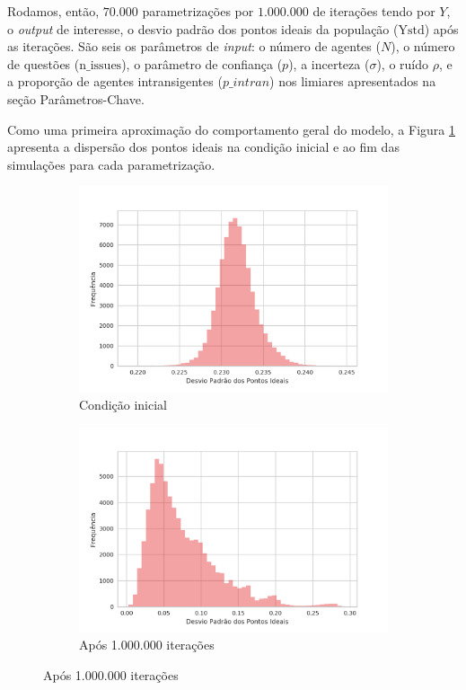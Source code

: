 Rodamos, então, \(70.000\) parametrizações por \(1.000.000\) de iterações tendo
por \(Y\), o \textit{output} de interesse, o desvio padrão dos pontos ideais da
população (\(\text{Ystd}\)) após as iterações. São seis os parâmetros de
\textit{input}: o número de agentes (\(N\)), o número de questões
(\(\text{n\_issues}\)), o parâmetro de confiança (\(p\)), a incerteza
(\(\sigma\)), o ruído \(\rho\), e a proporção de agentes intransigentes
(\(p\_intran\)) nos limiares apresentados na seção Parâmetros-Chave.

Como uma primeira aproximação do comportamento geral do modelo, a Figura
\ref{fig:hists1} apresenta a dispersão dos pontos ideais na condição inicial e
ao fim das simulações para cada parametrização.

\begin{figure}[h]
    \centering
      \caption{Desvio padrão dos pontos ideais das populações para cada
        parametrização}
    \begin{subfigure}[b]{0.49\textwidth}
      \includegraphics[width=\textwidth]{ims/diststdinit.png}
      \caption{Condição inicial}
    \end{subfigure}
    \begin{subfigure}[b]{0.49\textwidth}
      \includegraphics[width=\textwidth]{ims/distY.png}
       \caption{Após 1.000.000 iterações}
      \end{subfigure}
      \label{fig:hists1}
    \end{figure}
    
